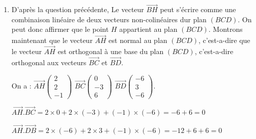 \documentclass[10pt]{article}
\providecommand{\vect}[1]{\overrightarrow{#1}}
\begin{document}
\begin{enumerate}
\begin{enumerate}
$\left\{\begin{array}{l c l} -6\beta&=&-1\\-3\alpha+3\beta &=& -1\\-6\alpha-6\beta&=&-4	\end{array}\right. \iff 
\left\{\begin{array}{l c l} \beta&=&\dfrac16\\-3\alpha &=& -1-\dfrac36\\-6\alpha&=&-4+1	\end{array}\right. \iff
 \left\{\begin{array}{l c l} \beta&=&\dfrac16\\-3\alpha &=& -\dfrac32\\6\alpha&=&-3	\end{array}\right.$
		 
		 $\iff \left\{\begin{array}{l c l} \beta&=&\dfrac16\\\alpha &=& \dfrac12\end{array}\right. $. \quad Donc $\vect{BH}=\dfrac12 \vect{BC}+\dfrac16 \vect{BD}$.
		\item D'après la question précédente, Le vecteur $\vect{BH}$ peut s'écrire comme une combinaison linéaire de deux vecteurs non-colinéaires dur plan $(BCD)$. On peut donc affirmer que le point $H$ appartient au plan $(BCD)$. Montrons maintenant que le vecteur $\vect{AH}$ est normal au plan $(BCD)$, c'est-a-dire que le vecteur $\vect{AH}$ est orthogonal à une base du plan $(BCD)$, c'est-a-dire orthogonal aux vecteurs $\vect{BC}$ et $\vect{BD}$.
		
		On a : \(\overrightarrow{AH}\begin{pmatrix}2\\2\\-1\end{pmatrix}\) \quad \(\overrightarrow{BC}\begin{pmatrix}0\\-3\\6\end{pmatrix}\) \quad \(\overrightarrow{BD}\begin{pmatrix}-6\\3\\-6\end{pmatrix}\).
		
		$\vect{AH}.\vect{BC}= 2\times 0+2\times (-3)+(-1)\times (-6)=-6+6=0$
		
		$\vect{AH}.\vect{DB}= 2\times (-6)+2\times 3+(-1)\times (-6)=-12+6+6=0$
		

\end{enumerate}
\end{enumerate}
\end{document}
